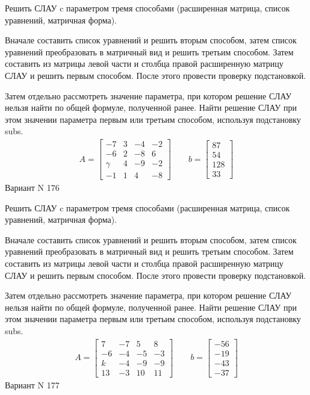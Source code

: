 \documentclass[11pt]{report}
\begin{document}
Решить СЛАУ c параметром тремя способами (расширенная матрица, список уравнений, матричная форма).

Вначале составить список уравнений и решить вторым способом,
затем список уравнений преобразовать в матричный вид и решить третьим способом.
Затем составить из матрицы левой части и столбца правой расширенную матрицу СЛАУ и решить первым способом.
После этого провести проверку подстановкой.

Затем отдельно рассмотреть значение параметра, при котором решение СЛАУ нельзя найти по общей формуле,
полученной ранее.
Найти решение СЛАУ при этом значении параметра первым или третьим способом, используя подстановку subs.
\begin{align*}
    A = \left[\begin{matrix}-7 & 3 & -4 & -2\\-6 & 2 & -8 & 6\\\gamma & 4 & -9 & -2\\-1 & 1 & 4 & -8\end{matrix}\right]
\qquad b = \left[\begin{matrix}87\\54\\128\\33\end{matrix}\right]
\end{align*}
\newpage
Вариант N 176


Решить СЛАУ c параметром тремя способами (расширенная матрица, список уравнений, матричная форма).

Вначале составить список уравнений и решить вторым способом,
затем список уравнений преобразовать в матричный вид и решить третьим способом.
Затем составить из матрицы левой части и столбца правой расширенную матрицу СЛАУ и решить первым способом.
После этого провести проверку подстановкой.

Затем отдельно рассмотреть значение параметра, при котором решение СЛАУ нельзя найти по общей формуле,
полученной ранее.
Найти решение СЛАУ при этом значении параметра первым или третьим способом, используя подстановку subs.
\begin{align*}
    A = \left[\begin{matrix}7 & -7 & 5 & 8\\-6 & -4 & -5 & -3\\k & -4 & -9 & -9\\13 & -3 & 10 & 11\end{matrix}\right]
\qquad b = \left[\begin{matrix}-56\\-19\\-43\\-37\end{matrix}\right]
\end{align*}
\newpage
Вариант N 177
\end{document}

